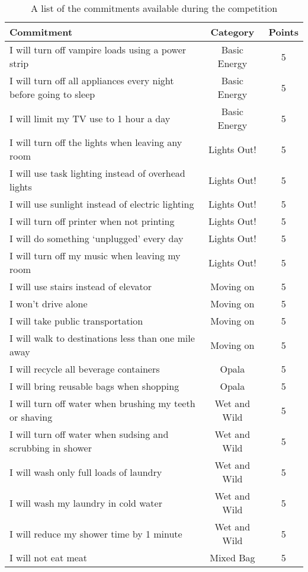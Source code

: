 \begin{table}[htbp]
	\centering
		\begin{tabular}{| l | c | c |}
			\hline
			Commitment & Category & Points \tabularnewline \hline \hline
I will turn off vampire loads using a power strip & Basic Energy & 5 \\
I will turn off all appliances every night before going to sleep & Basic Energy & 5 \\
I will limit my TV use to 1 hour a day & Basic Energy & 5 \\
I will turn off the lights when leaving any room & Lights Out! & 5 \\
I will use task lighting instead of overhead lights & Lights Out! & 5 \\
I will use sunlight instead of electric lighting & Lights Out! & 5 \\
I will turn off printer when not printing & Lights Out! & 5 \\
I will do something `unplugged' every day & Lights Out! & 5 \\
I will turn off my music when leaving my room & Lights Out! & 5 \\
I will use stairs instead of elevator & Moving on & 5 \\
I won't drive alone & Moving on & 5 \\
I will take public transportation & Moving on & 5 \\
I will walk to destinations less than one mile away & Moving on & 5 \\
I will recycle all beverage containers & Opala & 5 \\
I will bring reusable bags when shopping & Opala & 5 \\
I will turn off water when brushing my teeth or shaving & Wet and Wild & 5 \\
I will turn off water when sudsing and scrubbing in shower & Wet and Wild & 5 \\
I will wash only full loads of laundry & Wet and Wild & 5 \\
I will wash my laundry in cold water & Wet and Wild & 5 \\
I will reduce my shower time by 1 minute & Wet and Wild & 5 \\
I will not eat meat & Mixed Bag & 5 \\ \hline
		\end{tabular}
	\caption{A list of the commitments available during the competition}
\label{tab:commitment-list}
\end{table}



